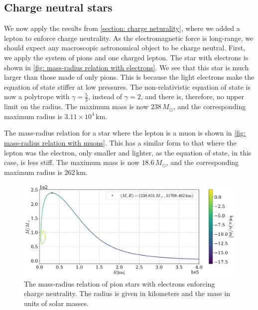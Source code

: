 \FloatBarrier
\subsection{Charge neutral stars}


We now apply the results from \autoref{section: charge neturality}, where we added a lepton to enforce charge neutrality.
As the electromagnetic force is long-range, we should expect any macroscopic astronomical object to be charge neutral.
First, we apply the system of pions and one charged lepton.
The star with electrons is shown in \autoref{fig: mass-radius relation with electrons}.
We see that this star is much larger than those made of only pions.
This is because the light electrons make the equation of state stiffer at low pressures.
The non-relativistic equation of state is now a polytrope with $\gamma = \frac{5}{3}$, instead of $\gamma = 2$, and there is, therefore, no upper limit on the radius.
The maximum mass is now $238\, M_\odot $, and the corresponding maximum radius is $ 3.11\times 10^4 \,\text{km}$.

The mass-radius relation for a star where the lepton is a muon is shown in \autoref{fig: mass-radius relation with muons}.
This has a similar form to that where the lepton was the electron, only smaller and lighter, as the equation of state, in this case, is less stiff.
The maximum mass is now $18.6\, M_\odot $, and the corresponding maximum radius is $ 262 \,\text{km}$.

\begin{figure}[!htb]
    \centering
    \includegraphics[width=\textwidth]{../scripts/figurer/pion_star/mass_radius__e.pdf}
    \caption{
        The mass-radius relation of pion stars with electrons enforcing charge neutrality.
        The radius is given in kilometers and the mass in units of solar masses.
        }
        \label{fig: mass-radius relation with electrons}
\end{figure}


